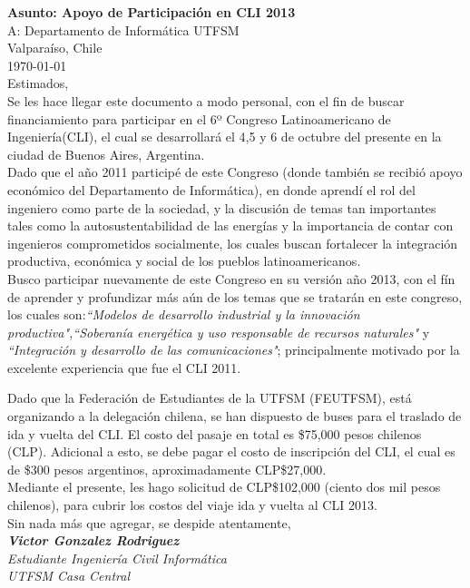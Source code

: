\documentclass[12pt,letterpaper]{article}
\begin{document}
$ $ \\ \textbf{Asunto: Apoyo de Participación en CLI 2013} \\ A: Departamento de Informática UTFSM \\ Valparaíso, Chile \\  \today \\

Estimados,\\

Se les hace llegar este documento a modo personal, con el fin de buscar financiamiento para participar en el 6º Congreso Latinoamericano de Ingeniería(CLI), el cual se desarrollará el 4,5 y 6 de octubre del presente en la ciudad de Buenos Aires, Argentina.\\

Dado que el año 2011 participé de este Congreso (donde también se recibió apoyo económico del Departamento de Informática), en donde aprendí el rol del ingeniero como parte de la sociedad, y la discusión de temas tan importantes tales como la autosustentabilidad de las energías y la importancia de contar con ingenieros comprometidos socialmente, los cuales buscan fortalecer la integración productiva, económica y social de los pueblos latinoamericanos.\\

Busco participar nuevamente de este Congreso en su versión año 2013, con el fín de aprender y profundizar más aún de los temas que se tratarán en este congreso, los cuales son:\textit{``Modelos de desarrollo industrial y la innovación productiva",``Soberanía energética y uso responsable de recursos naturales"} y \textit{``Integración y desarrollo de las comunicaciones"}; principalmente motivado por la excelente experiencia que fue el CLI 2011.

Dado que la Federación de Estudiantes de la UTFSM (FEUTFSM), está organizando a la delegación chilena, se han dispuesto de buses para el traslado de ida y vuelta del CLI. El costo del pasaje en total es \$75,000 pesos chilenos (CLP). Adicional a esto, se debe pagar el costo de inscripción del CLI, el cual es de \$300 pesos argentinos, aproximadamente CLP\$27,000.\\

Mediante el presente, les hago solicitud de CLP\$102,000 (ciento dos mil pesos chilenos), para cubrir los costos del viaje ida y vuelta al CLI 2013.\\

Sin nada más que agregar, se despide atentamente,\\
\textit{
$ $ \\\textbf{Victor Gonzalez Rodriguez}\\
Estudiante Ingeniería Civil Informática \\
UTFSM Casa Central
}
\end{document}
